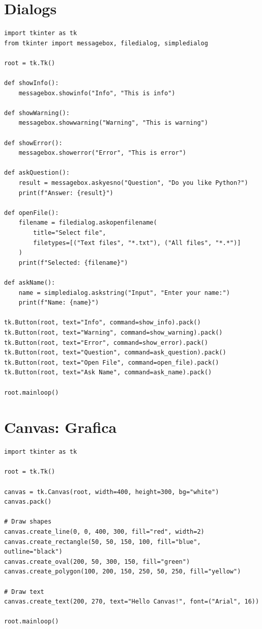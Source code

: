 \section{Dialogs}

\begin{lstlisting}
import tkinter as tk
from tkinter import messagebox, filedialog, simpledialog

root = tk.Tk()

def showInfo():
    messagebox.showinfo("Info", "This is info")

def showWarning():
    messagebox.showwarning("Warning", "This is warning")

def showError():
    messagebox.showerror("Error", "This is error")

def askQuestion():
    result = messagebox.askyesno("Question", "Do you like Python?")
    print(f"Answer: {result}")

def openFile():
    filename = filedialog.askopenfilename(
        title="Select file",
        filetypes=[("Text files", "*.txt"), ("All files", "*.*")]
    )
    print(f"Selected: {filename}")

def askName():
    name = simpledialog.askstring("Input", "Enter your name:")
    print(f"Name: {name}")

tk.Button(root, text="Info", command=show_info).pack()
tk.Button(root, text="Warning", command=show_warning).pack()
tk.Button(root, text="Error", command=show_error).pack()
tk.Button(root, text="Question", command=ask_question).pack()
tk.Button(root, text="Open File", command=open_file).pack()
tk.Button(root, text="Ask Name", command=ask_name).pack()

root.mainloop()
\end{lstlisting}

\section{Canvas: Grafica}

\begin{lstlisting}
import tkinter as tk

root = tk.Tk()

canvas = tk.Canvas(root, width=400, height=300, bg="white")
canvas.pack()

# Draw shapes
canvas.create_line(0, 0, 400, 300, fill="red", width=2)
canvas.create_rectangle(50, 50, 150, 100, fill="blue", outline="black")
canvas.create_oval(200, 50, 300, 150, fill="green")
canvas.create_polygon(100, 200, 150, 250, 50, 250, fill="yellow")

# Draw text
canvas.create_text(200, 270, text="Hello Canvas!", font=("Arial", 16))

root.mainloop()
\end{lstlisting}

